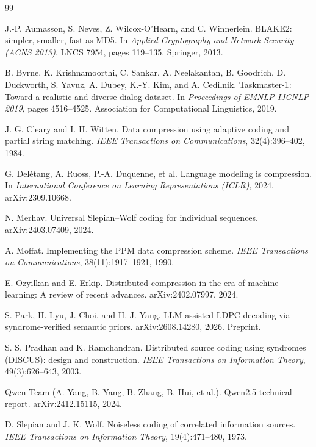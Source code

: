 \documentclass[11pt]{article}
\begin{document}
\begin{thebibliography}{99}

J.-P. Aumasson, S. Neves, Z. Wilcox-O'Hearn, and C. Winnerlein.
BLAKE2: simpler, smaller, fast as MD5.
In \emph{Applied Cryptography and Network Security (ACNS 2013)}, LNCS 7954, pages 119--135.
Springer, 2013.

B. Byrne, K. Krishnamoorthi, C. Sankar, A. Neelakantan, B. Goodrich, D. Duckworth, S. Yavuz,
A. Dubey, K.-Y. Kim, and A. Cedilnik.
Taskmaster-1: Toward a realistic and diverse dialog dataset.
In \emph{Proceedings of EMNLP-IJCNLP 2019}, pages 4516--4525. Association for Computational
Linguistics, 2019.

J. G. Cleary and I. H. Witten.
Data compression using adaptive coding and partial string matching.
\emph{IEEE Transactions on Communications}, 32(4):396--402, 1984.

G. Del\'etang, A. Ruoss, P.-A. Duquenne, et al.
Language modeling is compression.
In \emph{International Conference on Learning Representations (ICLR)}, 2024. arXiv:2309.10668.

N. Merhav.
Universal Slepian--Wolf coding for individual sequences.
arXiv:2403.07409, 2024.

A. Moffat.
Implementing the PPM data compression scheme.
\emph{IEEE Transactions on Communications}, 38(11):1917--1921, 1990.

E. Ozyilkan and E. Erkip.
Distributed compression in the era of machine learning: A review of recent advances.
arXiv:2402.07997, 2024.

S. Park, H. Lyu, J. Choi, and H. J. Yang.
LLM-assisted LDPC decoding via syndrome-verified semantic priors.
arXiv:2608.14280, 2026. Preprint.

S. S. Pradhan and K. Ramchandran.
Distributed source coding using syndromes (DISCUS): design and construction.
\emph{IEEE Transactions on Information Theory}, 49(3):626--643, 2003.

Qwen Team (A. Yang, B. Yang, B. Zhang, B. Hui, et al.).
Qwen2.5 technical report.
arXiv:2412.15115, 2024.

D. Slepian and J. K. Wolf.
Noiseless coding of correlated information sources.
\emph{IEEE Transactions on Information Theory}, 19(4):471--480, 1973.


\end{thebibliography}
\end{document}
